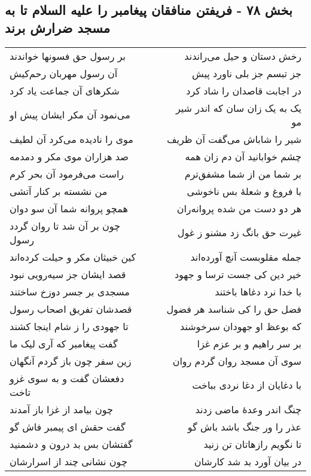 \begin{center}
\section*{بخش ۷۸ - فریفتن منافقان پیغامبر را علیه السلام تا به مسجد ضرارش برند}
\label{sec:sh078}
\begin{longtable}{l p{0.5cm} r}
بر رسول حق فسونها خواندند
&&
رخش دستان و حیل می‌راندند
\\
آن رسول مهربان رحم‌کیش
&&
جز تبسم جز بلی ناورد پیش
\\
شکرهای آن جماعت یاد کرد
&&
در اجابت قاصدان را شاد کرد
\\
می‌نمود آن مکر ایشان پیش او
&&
یک به یک زان سان که اندر شیر مو
\\
موی را نادیده می‌کرد آن لطیف
&&
شیر را شاباش می‌گفت آن ظریف
\\
صد هزاران موی مکر و دمدمه
&&
چشم خوابانید آن دم زان همه
\\
راست می‌فرمود آن بحر کرم
&&
بر شما من از شما مشفق‌ترم
\\
من نشسته بر کنار آتشی
&&
با فروغ و شعلهٔ بس ناخوشی
\\
همچو پروانه شما آن سو دوان
&&
هر دو دست من شده پروانه‌ران
\\
چون بر آن شد تا روان گردد رسول
&&
غیرت حق بانگ زد مشنو ز غول
\\
کین خبیثان مکر و حیلت کرده‌اند
&&
جمله مقلوبست آنچ آورده‌اند
\\
قصد ایشان جز سیه‌رویی نبود
&&
خیر دین کی جست ترسا و جهود
\\
مسجدی بر جسر دوزخ ساختند
&&
با خدا نرد دغاها باختند
\\
قصدشان تفریق اصحاب رسول
&&
فضل حق را کی شناسد هر فضول
\\
تا جهودی را ز شام اینجا کشند
&&
که بوعظ او جهودان سرخوشند
\\
گفت پیغامبر که آری لیک ما
&&
بر سر راهیم و بر عزم غزا
\\
زین سفر چون باز گردم آنگهان
&&
سوی آن مسجد روان گردم روان
\\
دفعشان گفت و به سوی غزو تاخت
&&
با دغایان از دغا نردی بباخت
\\
چون بیامد از غزا باز آمدند
&&
چنگ اندر وعدهٔ ماضی زدند
\\
گفت حقش ای پیمبر فاش گو
&&
عذر را ور جنگ باشد باش گو
\\
گفتشان بس بد درون و دشمنید
&&
تا نگویم رازهاتان تن زنید
\\
چون نشانی چند از اسرارشان
&&
در بیان آورد بد شد کارشان
\\

\end{longtable}
\end{center}
